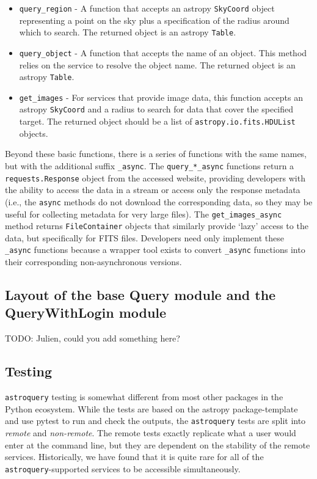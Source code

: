 \documentclass[twocolumn]{aastex61}
\newcommand{\package}[1]{\texttt{#1}\xspace}
\newcommand{\astroquery}{\package{astroquery}}
\begin{document}
\begin{itemize}
    \item \texttt{query\_region} - A function that accepts an astropy
        \texttt{SkyCoord} object representing a point on the sky plus a
        specification of the radius around which to search.
        The returned object is an astropy \texttt{Table}.
    \item \texttt{query\_object} - A function that accepts the name of an
        object.  This method relies on the service to resolve the object name.
        The returned object is an astropy \texttt{Table}.
    \item \texttt{get\_images} - For services that provide image data, this
        function accepts an astropy \texttt{SkyCoord} and a radius to search for data
        that cover the specified target. The returned object should be a list
        of \texttt{astropy.io.fits.HDUList} objects.
\end{itemize}

Beyond these basic functions, there is a series of functions with the same
names, but with the additional suffix \texttt{\_async}.  The
\texttt{query\_*\_async} functions return a \texttt{requests.Response} object
from the accessed website, providing developers with
the ability to access the data in a stream or access only the response
metadata (i.e., the \texttt{async} methods do not download the corresponding
data, so they may be useful for collecting metadata for very large files).  The
\texttt{get\_images\_async} method returns
\texttt{FileContainer} objects that similarly provide `lazy' access to the
data, but specifically for FITS files.  Developers need only implement
these \texttt{\_async} functions because a wrapper tool exists to convert
\texttt{\_async} functions into their corresponding non-asynchronous versions.

\subsection{Layout of the base Query module and the QueryWithLogin module}
{\color{red}TODO: Julien, could you add something here?}

\subsection{Testing}
\astroquery testing is somewhat different from most other packages in the Python
ecosystem.  While the tests are based on the astropy package-template and use
pytest to run and check the outputs, the \astroquery tests are split into
\emph{remote} and \emph{non-remote}.  The remote tests exactly replicate what a user
would enter at the command line, but they are dependent on the stability of the
remote services.  Historically, we have found that it is quite rare for all of
the \texttt{astroquery}-supported services to be accessible simultaneously.
\end{document}
